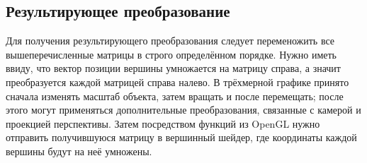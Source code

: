     \subsection{Результирующее преобразование}
Для получения результирующего преобразования следует переменожить все вышеперечисленные матрицы 
в строго определённом порядке. Нужно иметь ввиду, что вектор позиции вершины умножается на матрицу справа, 
а значит преобразуется каждой матрицей справа налево. В трёхмерной графике принято сначала изменять масштаб объекта, 
затем вращать и после перемещать; после этого могут применяться дополнительные преобразования, связанные с камерой 
и проекцией перспективы. Затем посредством функций из OpenGL нужно отправить получившуюся 
матрицу в вершинный шейдер, где координаты каждой вершины будут на неё умножены.
